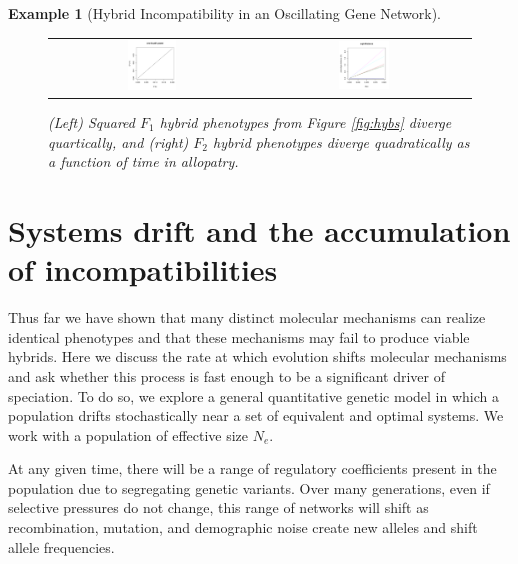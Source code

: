 \documentclass{article}
\newcommand{\1}{\mathbbm{1}}
\newtheorem{example}{Example}
\begin{document}
\begin{example}[Hybrid Incompatibility in an Oscillating Gene Network]
  \begin{figure}[H]
    \centering
    \begin{tabular}{cc}
    \includegraphics[width=0.25\textwidth, height=0.125\paperheight]{figures/f1_quartic2} &
    \includegraphics[width=0.25\textwidth, height=0.125\paperheight]{figures/f2_quad2}
    \end{tabular}
    \caption{(Left) Squared $F_1$ hybrid phenotypes from Figure \ref{fig:hybs} diverge quartically, and (right) $F_2$ hybrid phenotypes diverge quadratically as a function of time in allopatry.}
  \end{figure}
\end{example}
%
\section*{Systems drift and the accumulation of incompatibilities}
Thus far we have shown that many distinct molecular mechanisms can realize identical phenotypes
and that these mechanisms may fail to produce viable hybrids.
Here we discuss the rate at which evolution shifts molecular mechanisms
and ask whether this process is fast enough to be a significant driver of speciation.
To do so, we explore a general quantitative genetic model in which a population drifts stochastically
near a set of equivalent and optimal systems. We work with a population of effective size $N_e$. 

At any given time, there will be a range of regulatory coefficients present in the population
due to segregating genetic variants.
Over many generations, even if selective pressures do not change,
this range of networks will shift 
as recombination, mutation, and demographic noise create new alleles and shift allele frequencies.
\end{document}
